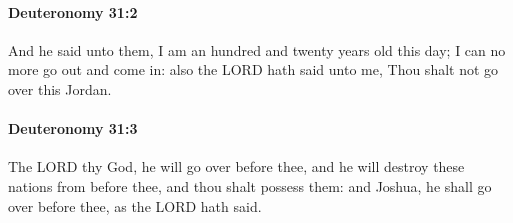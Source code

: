 		\paragraph{Deuteronomy 31:2} %
			\label{DEUTERONOMY-31-2}

			And he said unto them, I am an hundred and twenty years old this day; I can no more go out and come in: also the LORD hath said unto me, Thou shalt not go over this Jordan.


		\paragraph{Deuteronomy 31:3} %
			\label{DEUTERONOMY-31-3}

			The LORD thy God, he will go over before thee, and he will destroy these nations from before thee, and thou shalt possess them: and Joshua, he shall go over before thee, as the LORD hath said.

